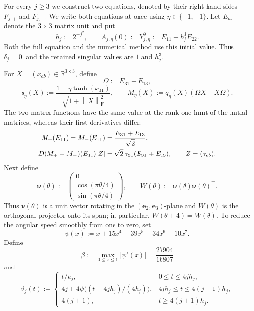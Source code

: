 \documentclass[]{article}
\numberwithin{equation}{section}
\theoremstyle{plain}
\theoremstyle{remark}
\newcommand{\F}{\mathrm F}
\newcommand{\norm}[1]{\left\lVert #1\right\rVert}
\begin{document}
For every $j\ge3$ we construct two equations, denoted by their
right-hand sides $F_{j,+}$ and $F_{j,-}$.  We write both equations at
once using \(\eta\in\{+1,-1\}\).  Let $E_{ab}$ denote the
$3\times3$ matrix unit and put
\begin{equation}\label{eq:hj}
 h_j:=2^{-j^2},
 \qquad A_{j,\eta}(0):=Y_{j,\eta}^0:=E_{11}+h_j^3E_{22}.
\end{equation}
Both the full equation and the numerical method use this initial value.
Thus $\delta_j=0$, and the retained singular values are $1$ and
$h_j^3$.

For $X=(x_{ab})\in\mathbb R^{3\times3}$, define
\begin{equation}\label{eq:M-field}
 \Omega:=E_{31}-E_{13},
\end{equation}
\begin{equation}\label{eq:q-field}
 q_\eta(X):=\frac{1+\eta\tanh(x_{31})}
 {\sqrt{1+\norm{X}_{\F}^2}},
 \qquad M_\eta(X):=q_\eta(X)(\Omega X-X\Omega).
\end{equation}
The two matrix functions have the same value at the rank-one limit of
the initial matrices, whereas their first derivatives differ:
\begin{align}
 M_+(E_{11})=M_-(E_{11})
 &=\frac{E_{31}+E_{13}}{\sqrt2},\notag\\
 D(M_+-M_-)(E_{11})[Z]
 &=\sqrt2\,z_{31}(E_{31}+E_{13}),
 \qquad Z=(z_{ab}).
 \label{eq:pair-design}
\end{align}
Next define
\begin{equation}\label{eq:nu-W}
 \boldsymbol{\nu}(\theta):=
 \begin{pmatrix}0\\ \cos(\pi\theta/4)\\ \sin(\pi\theta/4)\end{pmatrix},
 \qquad W(\theta):=\boldsymbol{\nu}(\theta)
 \boldsymbol{\nu}(\theta)^\top.
\end{equation}
Thus $\boldsymbol\nu(\theta)$ is a unit vector rotating in the
$(\boldsymbol e_2,\boldsymbol e_3)$-plane and $W(\theta)$ is the
orthogonal projector onto its span; in particular, $W(\theta+4)=W(\theta)$.
To reduce the angular speed smoothly from one to zero, set
\begin{equation}\label{eq:psi-def}
 \psi(x):=x+15x^4-39x^5+34x^6-10x^7.
\end{equation}
Define
\begin{equation}\label{eq:beta}
 \beta:=\max_{0\le x\le1}|\psi'(x)|=\frac{27904}{16807}
\end{equation}
and
\begin{equation}\label{eq:phase-def}
 \vartheta_j(t):=
 \begin{cases}
  t/h_j,&0\le t\le4jh_j,\\
  4j+4\psi\bigl((t-4jh_j)/(4h_j)\bigr),
       &4jh_j\le t\le4(j+1)h_j,\\
  4(j+1),&t\ge4(j+1)h_j.
 \end{cases}
\end{equation}
\end{document}
